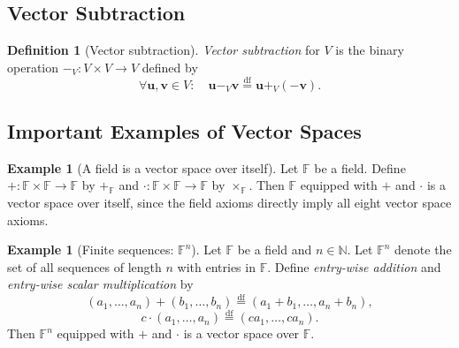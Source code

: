 \documentclass[11pt, a4paper, notitlepage]{report}
\theoremstyle{definition}
\newtheorem{definition}[theorem]{Definition}
\newtheorem{example}[theorem]{Example}
\theoremstyle{remark}
\begin{document}
\subsection{Vector Subtraction}

\begin{definition}[Vector subtraction]\label{def:vector-subtraction}
\emph{Vector subtraction} for $V$ is the binary operation $-_V : V \times V \to V$ defined by
\[ \forall \mathbf{u}, \mathbf{v} \in V: \quad \mathbf{u} -_V \mathbf{v} \stackrel{\mathrm{df}}{=} \mathbf{u} +_V (-\mathbf{v}). \]
\end{definition}

\subsection{Important Examples of Vector Spaces}

\begin{example}[A field is a vector space over itself]\label{ex:field-as-vs}
Let $\mathbb{F}$ be a field. Define $+: \mathbb{F} \times \mathbb{F} \to \mathbb{F}$ by $+_\mathbb{F}$ and $\cdot: \mathbb{F} \times \mathbb{F} \to \mathbb{F}$ by $\times_\mathbb{F}$. Then $\mathbb{F}$ equipped with $+$ and $\cdot$ is a vector space over itself, since the field axioms directly imply all eight vector space axioms.
\end{example}

\begin{example}[Finite sequences: $\mathbb{F}^n$]\label{ex:Fn}
Let $\mathbb{F}$ be a field and $n \in \mathbb{N}$. Let $\mathbb{F}^n$ denote the set of all sequences of length $n$ with entries in $\mathbb{F}$. Define \emph{entry-wise addition} and \emph{entry-wise scalar multiplication} by
\[
  (a_1, \ldots, a_n) + (b_1, \ldots, b_n) \stackrel{\mathrm{df}}{=} (a_1 + b_1, \ldots, a_n + b_n),
\]
\[
  c \cdot (a_1, \ldots, a_n) \stackrel{\mathrm{df}}{=} (ca_1, \ldots, ca_n).
\]
Then $\mathbb{F}^n$ equipped with $+$ and $\cdot$ is a vector space over $\mathbb{F}$.
\end{example}
\end{document}
